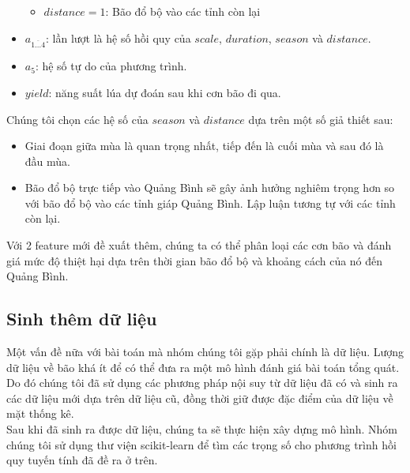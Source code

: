 \documentclass[12pt]{report}
\begin{document}
\begin{flushleft}
\begin{itemize}
\begin{itemize}
				\item $distance = 1$: Bão đổ bộ vào các tỉnh còn lại
			\end{itemize}

		\item $a^{}_{\overline{1 \dots 4}}$: lần lượt là hệ số hồi quy của $scale$, $duration$, $season$ và $distance$.

		\item $a_{5}$: hệ số tự do của phương trình.

		\item $yield$: năng suất lúa dự đoán sau khi cơn bão đi qua.
	\end{itemize}

	Chúng tôi chọn các hệ số của $season$ và $distance$ dựa trên một số giả thiết sau:
	\begin{itemize}
		\item Giai đoạn giữa mùa là quan trọng nhất, tiếp đến là cuối mùa và sau đó là đầu mùa.

		\item Bão đổ bộ trực tiếp vào Quảng Bình sẽ gây ảnh hưởng nghiêm trọng hơn so với bão đổ bộ vào các tỉnh giáp Quảng Bình. Lập luận tương tự với các tỉnh còn lại.
	\end{itemize}

	Với 2 feature mới đề xuất thêm, chúng ta có thể phân loại các cơn bão và đánh giá mức độ thiệt hại dựa trên thời gian bão đổ bộ và khoảng cách của nó đến Quảng Bình.
\end{flushleft}

\subsection{Sinh thêm dữ liệu} %
\label{sub:sinh_thêm_dữ_liệu}
\begin{flushleft}
	Một vấn đề nữa với bài toán mà nhóm chúng tôi gặp phải chính là dữ liệu. Lượng dữ liệu về bão khá ít để có thể đưa ra một mô hình đánh giá bài toán tổng quát. Do đó chúng tôi đã sử dụng các phương pháp nội suy từ dữ liệu đã có và sinh ra các dữ liệu mới dựa trên dữ liệu cũ, đồng thời giữ được đặc điểm của dữ liệu về mặt thống kê.
	\\[\baselineskip]

	Sau khi đã sinh ra được dữ liệu, chúng ta sẽ thực hiện xây dựng mô hình. Nhóm chúng tôi sử dụng thư viện scikit-learn để tìm các trọng số cho phương trình hồi quy tuyến tính đã đề ra ở trên.
\end{flushleft}
\end{document}
